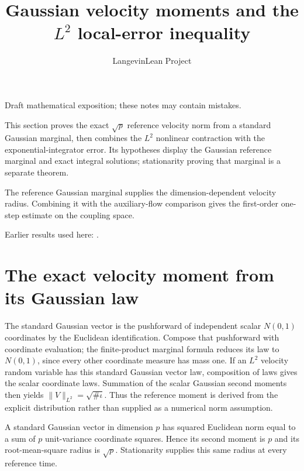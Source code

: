 \documentclass[11pt,a4paper]{article}
\title{\texorpdfstring{Gaussian velocity moments and the \(L^{2}\) local-error inequality}{Gaussian velocity moments and the L² local-error inequality}}
\author{LangevinLean Project}
\date{}
\begin{document}
\maketitle
Draft mathematical exposition; these notes may contain mistakes.


This section proves the exact \(\sqrt p\) reference velocity norm from a standard Gaussian marginal, then combines the \(L^{2}\) nonlinear contraction with the exponential-integrator error. Its hypotheses display the Gaussian reference marginal and exact integral solutions; stationarity proving that marginal is a separate theorem.



The reference Gaussian marginal supplies the dimension-dependent velocity radius. Combining it with the auxiliary-flow comparison gives the first-order one-step estimate on the coupling space.



Earlier results used here: \cite[Section~3.24]{LangevinLean2026ULASC}.

\section{\texorpdfstring{The exact velocity moment from its Gaussian law}{The exact velocity moment from its Gaussian law}}


The standard Gaussian vector is the pushforward of independent scalar \(N(0,1)\) coordinates by the Euclidean identification. Compose that pushforward with coordinate evaluation; the finite-product marginal formula reduces its law to \(N(0,1)\), since every other coordinate measure has mass one. If an \(L^{2}\) velocity random variable has this standard Gaussian vector law, composition of laws gives the scalar coordinate laws. Summation of the scalar Gaussian second moments then yields \(\|V\|_{L^2}=\sqrt{\#\iota}\). Thus the reference moment is derived from the explicit distribution rather than supplied as a numerical norm assumption.



A standard Gaussian vector in dimension \(p\) has squared Euclidean norm equal to a sum of \(p\) unit-variance coordinate squares. Hence its second moment is \(p\) and its root-mean-square radius is \(\sqrt p\). Stationarity supplies this same radius at every reference time.
\end{document}
